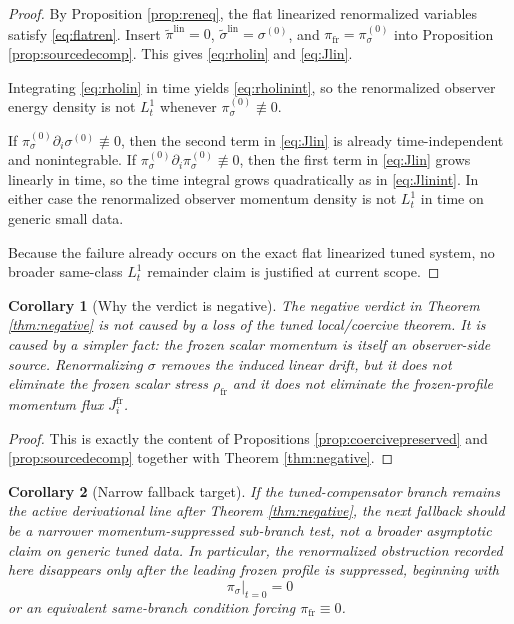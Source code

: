 \documentclass[11pt]{article}
\newtheorem{corollary}{Corollary}
\begin{document}
\begin{proof}
By Proposition \ref{prop:reneq}, the flat linearized renormalized variables satisfy \eqref{eq:flatren}. Insert \(\widetilde{\pi}^{\mathrm{lin}}=0\), \(\widetilde{\sigma}^{\mathrm{lin}}=\sigma^{(0)}\), and \(\pi_{\mathrm{fr}}=\pi_\sigma^{(0)}\) into Proposition \ref{prop:sourcedecomp}. This gives \eqref{eq:rholin} and \eqref{eq:Jlin}.

Integrating \eqref{eq:rholin} in time yields \eqref{eq:rholinint}, so the renormalized observer energy density is not \(L_t^1\) whenever \(\pi_\sigma^{(0)}\not\equiv 0\).

If \(\pi_\sigma^{(0)}\partial_i\sigma^{(0)}\not\equiv 0\), then the second term in \eqref{eq:Jlin} is already time-independent and nonintegrable. If \(\pi_\sigma^{(0)}\partial_i\pi_\sigma^{(0)}\not\equiv 0\), then the first term in \eqref{eq:Jlin} grows linearly in time, so the time integral grows quadratically as in \eqref{eq:Jlinint}. In either case the renormalized observer momentum density is not \(L_t^1\) in time on generic small data.

Because the failure already occurs on the exact flat linearized tuned system, no broader same-class \(L_t^1\) remainder claim is justified at current scope.
\end{proof}

\begin{corollary}[Why the verdict is negative]
\label{cor:whyneg}
The negative verdict in Theorem \ref{thm:negative} is not caused by a loss of the tuned local/coercive theorem. It is caused by a simpler fact: the frozen scalar momentum is itself an observer-side source. Renormalizing \(\sigma\) removes the induced linear drift, but it does not eliminate the frozen scalar stress \(\rho_{\mathrm{fr}}\) and it does not eliminate the frozen-profile momentum flux \(J_i^{\mathrm{fr}}\).
\end{corollary}

\begin{proof}
This is exactly the content of Propositions \ref{prop:coercivepreserved} and \ref{prop:sourcedecomp} together with Theorem \ref{thm:negative}.
\end{proof}

\begin{corollary}[Narrow fallback target]
\label{cor:fallback}
If the tuned-compensator branch remains the active derivational line after Theorem \ref{thm:negative}, the next fallback should be a narrower \emph{momentum-suppressed sub-branch test}, not a broader asymptotic claim on generic tuned data. In particular, the renormalized obstruction recorded here disappears only after the leading frozen profile is suppressed, beginning with
\begin{equation}
\pi_\sigma|_{t=0}=0
\label{eq:momentumsuppressed}
\end{equation}
or an equivalent same-branch condition forcing \(\pi_{\mathrm{fr}}\equiv 0\).
\end{corollary}
\end{document}
